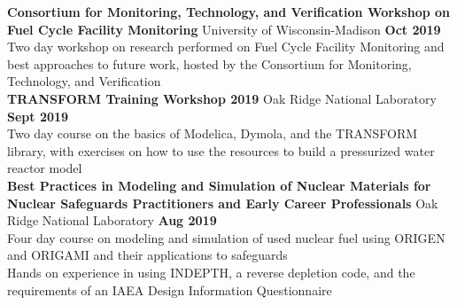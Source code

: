 \documentclass[margin,line]{resume}
\begin{document}
\begin{resume}
    \textbf{Consortium for Monitoring, Technology, and Verification Workshop on Fuel Cycle Facility Monitoring} 
    University of Wisconsin-Madison \hfill \textbf{Oct 2019} \\
    Two day workshop on research performed on Fuel Cycle Facility Monitoring and best approaches to future work, hosted by the Consortium for Monitoring, Technology, and Verification \\
    \textbf{TRANSFORM Training Workshop 2019} 
    Oak Ridge National Laboratory \hfill \textbf{Sept 2019} \\
    Two day course on the basics of Modelica, Dymola, and the TRANSFORM library, with exercises on how to use the resources to build a pressurized water reactor model \\
    \textbf{Best Practices in Modeling and Simulation of Nuclear Materials for Nuclear Safeguards Practitioners and Early Career Professionals} 
    Oak Ridge National Laboratory \hfill \textbf{Aug 2019} \\
    Four day course on modeling and simulation of used nuclear fuel using ORIGEN and ORIGAMI and their applications to safeguards \\
    Hands on experience in using INDEPTH, a reverse depletion code, and the requirements of an IAEA Design Information Questionnaire 
    





\end{resume}
\end{document}
